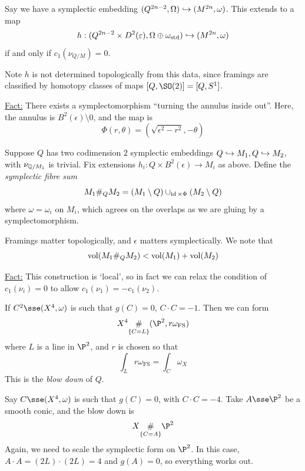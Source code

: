 \documentclass{article}
\begin{document}
\begin{corollary}
    Say we have a symplectic embedding \((Q^{2n-2}, \Omega) \hookrightarrow (M^{2n}, \omega)\). This extends to a map
    \[h : (Q^{2n-2} \times D^2(\varepsilon), \Omega \oplus \omega_{\text{std}}) \hookrightarrow (M^{2n}, \omega)\]
    if and only if \(c_1(\nu_{Q/M}) = 0\).
\end{corollary}

\begin{remark}
    Note \(h\) is not determined topologically from this data, since framings are classified by homotopy classes of maps \([Q, \SO(2)] = [Q, S^1]\).
\end{remark}

\underline{Fact:} There exists a symplectomorphism ``turning the annulus inside out''. Here, the annulus is \(B^2(\epsilon)\setminus 0\), and the map is
\[\Phi(r, \theta) = \left(\sqrt{\epsilon^2 - r^2}, -\theta\right)\]

Suppose \(Q\) has two codimension \(2\) symplectic embeddings \(Q \hookrightarrow M_1, Q \hookrightarrow M_2\), with \(\nu_{\mathbb{Q}/M_1}\) is trivial. Fix extensions \(h_i : Q \times B^2(\epsilon) \to M_i\) as above. Define the \emph{symplectic fibre sum}
\[M_1 \#_Q M_2 = (M_1 \setminus Q) \cup_{\operatorname{id} \times \Phi} (M_2 \setminus Q)\]
where \(\omega = \omega_i\) on \(M_i\), which agrees on the overlaps as we are gluing by a symplectomorphism.

\begin{remark}
    Framings matter topologically, and \(\epsilon\) matters symplectically. We note that
    \[\operatorname{vol}(M_1 \#_Q M_2) < \operatorname{vol}(M_1) + \operatorname{vol}(M_2)\]
\end{remark}

\underline{Fact:} This construction is `local', so in fact we can relax the condition of \(c_1(\nu_i) = 0\) to allow \(c_1(\nu_1) = -c_1(\nu_2)\).

\begin{example}
    If \(C^2 \sse (X^4, \omega)\) is such that \(g(C) = 0\), \(C \cdot C = -1\). Then we can form 
    \[X^4 \underset{\{C = L\}}{\#}(\P^2, r \omega_{\text{FS}})\]
    where \(L\) is a line in \(\P^2\), and \(r\) is chosen so that
    \[\int_L r\omega_{\text{FS}} = \int_C\omega_X\]
    This is the \emph{blow down} of \(Q\).
\end{example}

\begin{example}
    Say \(C \sse (X^4, \omega)\) is such that \(g(C) = 0\), with \(C \cdot C = -4\). Take \(A \sse \P^2\) be a smooth conic, and the blow down is
    \[X \underset{\{C = A\}}{\#}\P^2\]
    Again, we need to scale the symplectic form on \(\P^2\). In this case, \(A \cdot A = (2L)\cdot (2L) = 4\) and \(g(A) = 0\), so everything works out.
\end{example}
\end{document}
